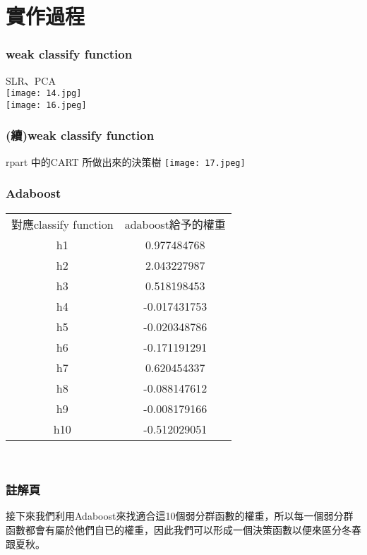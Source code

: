 \documentclass{beamer}
\begin{document}
\section{實作過程}
\begin{frame}
\frametitle{weak classify function}

\begin{center}
SLR、PCA\\
\texttt{[image: 14.jpg]}\\
\texttt{[image: 16.jpeg]}
\end{center}

\end{frame}

\begin{frame}
\frametitle{(續)weak classify function}
\begin{center}
rpart 中的CART 所做出來的決策樹
\texttt{[image: 17.jpeg]}
\end{center}
\end{frame}

\begin{frame}
\frametitle{Adaboost}
\begin{center}

\begin{tabular}{cc}
對應classify function&adaboost給予的權重\\
	h1&0.977484768\\
	  h2&2.043227987\\
	    h3&0.518198453\\
	     h4&-0.017431753\\
	      h5&-0.020348786\\
	       h6&-0.171191291\\
 h7&0.620454337\\
  h8&-0.088147612\\
   h9&-0.008179166\\
    h10&-0.512029051\\



\end{tabular}\\


\end{center}
\end{frame}
\begin{frame}
\frametitle{註解頁}
\hspace*{4mm} 接下來我們利用Adaboost來找適合這10個弱分群函數的權重，所以每一個弱分群函數都會有屬於他們自已的權重，因此我們可以形成一個決策函數以便來區分冬春跟夏秋。
\end{frame}
\end{document}
